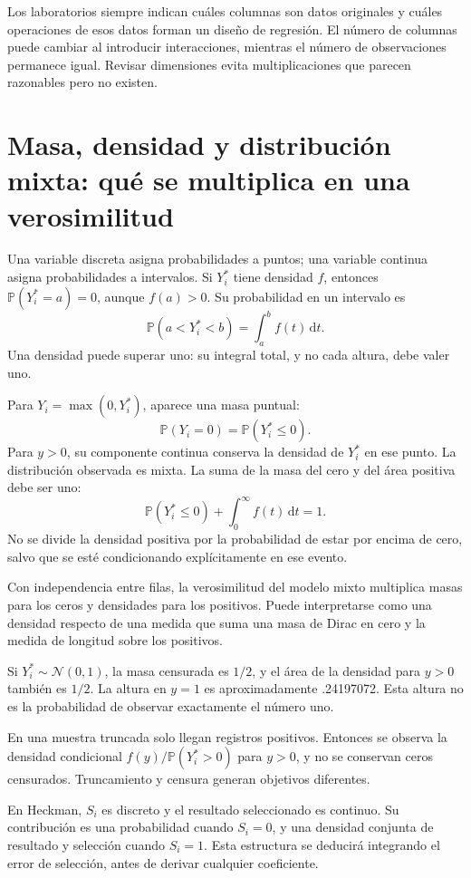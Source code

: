 \documentclass[11pt,a4paper]{article}
\newcommand{\Prob}{\mathbb P}
\newcommand{\dd}{\,\mathrm d}
\begin{document}
Los laboratorios siempre indican cuáles columnas son
datos originales y cuáles operaciones de esos datos
forman un diseño de regresión.
El número de columnas puede cambiar al introducir
interacciones, mientras el número de observaciones
permanece igual. Revisar dimensiones evita
multiplicaciones que parecen razonables pero no existen.

\clearpage
\section{Masa, densidad y distribución mixta: qué se multiplica en una verosimilitud}\label{unidad2}
Una variable discreta asigna probabilidades a puntos;
una variable continua asigna probabilidades a intervalos.
Si \(Y_i^\ast\) tiene densidad \(f\), entonces
\(\Prob(Y_i^\ast=a)=0\), aunque \(f(a)>0\).
Su probabilidad en un intervalo es
\[
\Prob(a<Y_i^\ast<b)=\int_a^b f(t)\dd t.
\]
Una densidad puede superar uno: su integral total,
y no cada altura, debe valer uno.

Para \(Y_i=\max(0,Y_i^\ast)\), aparece una masa puntual:
\[
\Prob(Y_i=0)=\Prob(Y_i^\ast\le0).
\]
Para \(y>0\), su componente continua conserva la densidad
de \(Y_i^\ast\) en ese punto.
La distribución observada es mixta.
La suma de la masa del cero y del área positiva debe ser uno:
\[
\Prob(Y_i^\ast\le0)+\int_0^\infty f(t)\dd t=1.
\]
No se divide la densidad positiva por la probabilidad
de estar por encima de cero, salvo que se esté
condicionando explícitamente en ese evento.

Con independencia entre filas, la verosimilitud del
modelo mixto multiplica masas para los ceros
y densidades para los positivos.
Puede interpretarse como una densidad respecto de
una medida que suma una masa de Dirac en cero
y la medida de longitud sobre los positivos.

\begin{ejemplo}
Si \(Y_i^\ast\sim\mathcal N(0,1)\), la masa censurada
es \(1/2\), y el área de la densidad para \(y>0\)
también es \(1/2\).
La altura en \(y=1\) es aproximadamente .24197072.
Esta altura no es la probabilidad de observar
exactamente el número uno.
\end{ejemplo}
En una muestra truncada solo llegan registros positivos.
Entonces se observa la densidad condicional
\(f(y)/\Prob(Y_i^\ast>0)\) para \(y>0\),
y no se conservan ceros censurados.
Truncamiento y censura generan objetivos diferentes.

En Heckman, \(S_i\) es discreto y el resultado seleccionado
es continuo. Su contribución es una probabilidad cuando
\(S_i=0\), y una densidad conjunta de resultado y selección
cuando \(S_i=1\).
Esta estructura se deducirá integrando el error de
selección, antes de derivar cualquier coeficiente.
\end{document}
